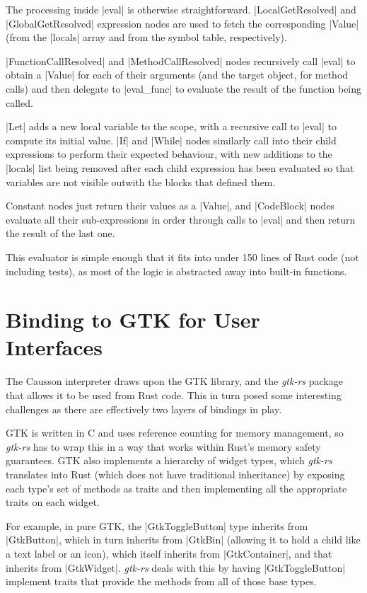 \documentclass[11pt]{report}
\begin{document}
The processing inside |eval| is otherwise straightforward. |LocalGetResolved| and |GlobalGetResolved| expression nodes are used to fetch the corresponding |Value| (from the |locals| array and from the symbol table, respectively).

|FunctionCallResolved| and |MethodCallResolved| nodes recursively call |eval| to obtain a |Value| for each of their arguments (and the target object, for method calls) and then delegate to |eval_func| to evaluate the result of the function being called.

|Let| adds a new local variable to the scope, with a recursive call to |eval| to compute its initial value. |If| and |While| nodes similarly call into their child expressions to perform their expected behaviour, with new additions to the |locals| list being removed after each child expression has been evaluated so that variables are not visible outwith the blocks that defined them.

Constant nodes just return their values as a |Value|, and |CodeBlock| nodes evaluate all their sub-expressions in order through calls to |eval| and then return the result of the last one.

This evaluator is simple enough that it fits into under 150 lines of Rust code (not including tests), as most of the logic is abstracted away into built-in functions.

\section{Binding to GTK for User Interfaces} \label{secGtkBinding}

The Causson interpreter draws upon the GTK library, and the \emph{gtk-rs} package that allows it to be used from Rust code. This in turn posed some interesting challenges as there are effectively two layers of bindings in play.

GTK is written in C and uses reference counting for memory management, so \emph{gtk-rs} has to wrap this in a way that works within Rust's memory safety guarantees. GTK also implements a hierarchy of widget types, which \emph{gtk-rs} translates into Rust (which does not have traditional inheritance) by exposing each type's set of methods as traits and then implementing all the appropriate traits on each widget.

For example, in pure GTK, the |GtkToggleButton| type inherits from |GtkButton|, which in turn inherits from |GtkBin| (allowing it to hold a child like a text label or an icon), which itself inherits from |GtkContainer|, and that inherits from |GtkWidget|. \emph{gtk-rs} deals with this by having |GtkToggleButton| implement traits that provide the methods from all of those base types.
\end{document}
